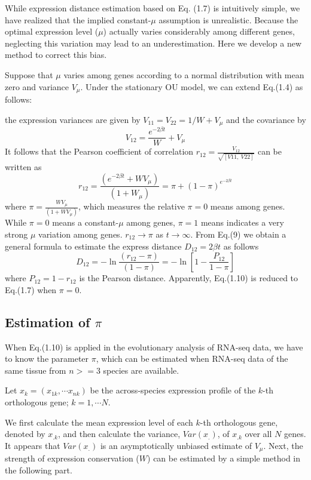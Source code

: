 \documentclass[]{book}
\begin{document}
While expression distance estimation based on Eq. (1.7) is intuitively simple, we have realized that the implied constant-\(\mu\) assumption is unrealistic. Because the optimal expression level (\(\mu\)) actually varies considerably among different genes, neglecting this variation may lead to an underestimation. Here we develop a new method to correct this bias.

Suppose that \(\mu\) varies among genes according to a normal distribution with mean zero and variance \(V_{\mu}\). Under the stationary OU model, we can extend Eq.(1.4) as follows:

the expression variances are given by \(V_{11}=V_{22}=1/W+V_{\mu}\) and the covariance by
\[V_{12}=\frac{e^{-2\beta t}}{W}+V_{\mu}\tag{1.8}\]
It follows that the Pearson coefficient of correlation \(r_{12}=\frac{V_{12}}{\sqrt{\left[V11,\  V22\right]}}\) can be written as
\[r_{12}=\frac{\left(e^{-2\beta t}+WV_{\mu}\right)}{\left(1+W_{\mu}\right)}=\pi+\left(1-\pi\right)^{e^{-2\beta t}}\tag{1.9}\]
where \(\pi=\frac{WV_{\mu}}{\left(1+WV_{\mu}\right)}\), which measures the relative \(\pi=0\) means among genes. While \(\pi=0\) means a constant-\(\mu\) among genes, \(\pi=1\) means indicates a very strong \(\mu\) variation among genes. \(r_{12}\rightarrow\pi\) as \(t\rightarrow \infty\). From Eq.(9) we obtain a general formula to estimate the express distance \(D_{12}=2\beta t\) as follows
\[D_{12}=-\ln\frac{\left(r_{12}-\pi\right)}{\left(1-\pi\right)}=-\ln\left[1-\frac{P_{12}}{1-\pi}\right]\tag{1.10}\]
where \(P_{12}=1-r_{12}\) is the Pearson distance. Apparently, Eq.(1.10) is reduced to Eq.(1.7) when \(\pi=0\).

\hypertarget{estimation-of-pi}{%
\subsection{\texorpdfstring{Estimation of \(\pi\)}{Estimation of \textbackslash{}pi}}\label{estimation-of-pi}}

When Eq.(1.10) is applied in the evolutionary analysis of RNA-seq data, we have to know the parameter \(\pi\), which can be estimated when RNA-seq data of the same tissue from \(n>=3\) species are available.

Let \(x_k=\left(x_{1k},\cdots x_{nk}\right)\) be the across-species expression profile of the \(k\)-th orthologous gene; \(k=1,\cdots N\).

We first calculate the mean expression level of each \(k\)-th orthologous gene, denoted by \(x_{.k}\), and then calculate the variance, \(Var\left(x_.\right)\), of \(x_{.k}\) over all \(N\) genes. It appears that \(Var\left(x_.\right)\) is an asymptotically unbiased estimate of \(V_\mu\). Next, the strength of expression conservation (\(W\)) can be estimated by a simple method in the following part.
\end{document}
